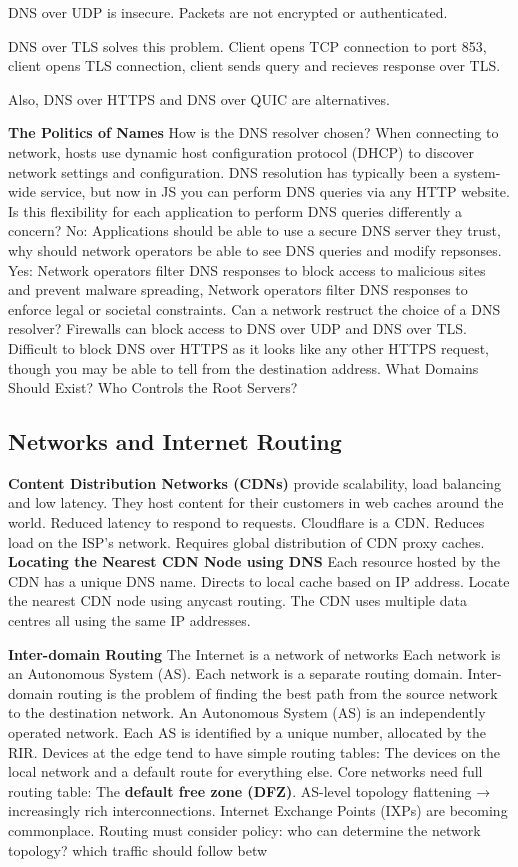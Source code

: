 \documentclass{article}
\begin{document}
DNS over UDP is insecure. Packets are not encrypted or authenticated.

DNS over TLS solves this problem. Client opens TCP connection to port 853, client opens TLS connection,
client sends query and recieves response over TLS\@.

Also, DNS over HTTPS and DNS over QUIC are alternatives.

\textbf{The Politics of Names}
How is the DNS resolver chosen? When connecting to network, hosts use dynamic host configuration protocol (DHCP)
to discover network settings and configuration.
DNS resolution has typically been a system-wide service, but now in JS you can perform DNS queries via any HTTP website.
Is this flexibility for each application to perform DNS queries differently a concern?
No: Applications should be able to use a secure DNS server they trust, why should network operators be able to see DNS queries and modify repsonses.
Yes: Network operators filter DNS responses to block access to malicious sites and prevent malware spreading,
Network operators filter DNS responses to enforce legal or societal constraints.
Can a network restruct the choice of a DNS resolver?
Firewalls can block access to DNS over UDP and DNS over TLS\@.
Difficult to block DNS over HTTPS as it looks like any other HTTPS request, though you may be able to tell from the destination address.
What Domains Should Exist?
Who Controls the Root Servers?



\subsection*{Networks and Internet Routing}

\textbf{Content Distribution Networks (CDNs)} provide scalability, load balancing and low latency.
They host content for their customers in web caches around the world.
Reduced latency to respond to requests.
Cloudflare is a CDN\@.
Reduces load on the ISP's network.
Requires global distribution of CDN proxy caches.
\textbf{Locating the Nearest CDN Node using DNS}
Each resource hosted by the CDN has a unique DNS name.
Directs to local cache based on IP address.
Locate the nearest CDN node using anycast routing.
The CDN uses multiple data centres \- all using the same IP addresses.

\textbf{Inter-domain Routing}
The Internet is a network of networks
Each network is an Autonomous System (AS).
Each network is a separate routing domain.
Inter-domain routing is the problem of finding the best path from the source network to the destination network.
An Autonomous System (AS) is an independently operated network.
Each AS is identified by a unique number, allocated by the RIR\@.
Devices at the edge tend to have simple routing tables: The devices on the local network and a default route for everything else.
Core networks need full routing table: The \textbf{default free zone (DFZ)}.
AS-level topology flattening → increasingly rich interconnections.
Internet Exchange Points (IXPs) are becoming commonplace.
Routing must consider policy: who can determine the network topology? which traffic should follow betw
\end{document}

